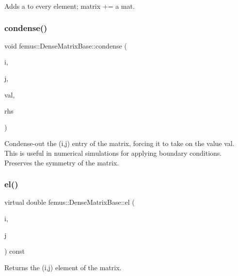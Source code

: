 Adds {\ttfamily a} to every element; matrix += a mat. 

\mbox{\label{classfemus_1_1_dense_matrix_base_af0dafc872890045e08a93f40fbc9b442}} 
\subsubsection{\texorpdfstring{condense()}{condense()}}
{\footnotesize\ttfamily void femus\+::\+Dense\+Matrix\+Base\+::condense (\begin{DoxyParamCaption}\item[{const int}]{i,  }\item[{const int}]{j,  }\item[{const double}]{val,  }\item[{\mbox{\hyperlink{classfemus_1_1_dense_vector_base}{Dense\+Vector\+Base}} \&}]{rhs }\end{DoxyParamCaption})\hspace{0.3cm}{\ttfamily [protected]}}

Condense-\/out the {\ttfamily }(i,j) entry of the matrix, forcing it to take on the value {\ttfamily val}. This is useful in numerical simulations for applying boundary conditions. Preserves the symmetry of the matrix. \mbox{\label{classfemus_1_1_dense_matrix_base_abaf98d937069f9df0829353d9454ad93}} 
\subsubsection{\texorpdfstring{el()}{el()}\hspace{0.1cm}{\footnotesize\ttfamily [1/2]}}
{\footnotesize\ttfamily virtual double femus\+::\+Dense\+Matrix\+Base\+::el (\begin{DoxyParamCaption}\item[{const int}]{i,  }\item[{const int}]{j }\end{DoxyParamCaption}) const\hspace{0.3cm}{\ttfamily [pure virtual]}}

\begin{DoxyReturn}{Returns}
the {\ttfamily }(i,j) element of the matrix. 
\end{DoxyReturn}


